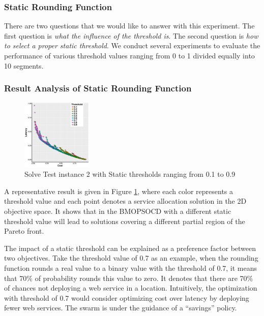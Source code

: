 \documentclass[10pt,journal,compsoc]{IEEEtran}
\begin{document}
\subsubsection{Static Rounding Function}
\label{sec:static_exp}
There are two questions that we would like to answer with this experiment. The first question is \textit{what the influence of the threshold is}. The second question is \textit{how to select a proper static threshold}. We conduct several experiments to evaluate the performance of various threshold values ranging from 0 to 1 divided equally into 10 segments. 

\subsubsection{Result Analysis of Static Rounding Function}
\label{sec:result_static}
\begin{figure}[h!]
	\centering
	\includegraphics[width=0.3\textwidth]{pics/static_threshold_problem_extra2.png}
	\caption{Solve Test instance 2 with Static thresholds ranging from 0.1 to 0.9}
	\label{fig:fullThreshold}
\end{figure}

A representative result is given in Figure \ref{fig:fullThreshold}, where each color represents a threshold value and each point denotes a service allocation solution in the 2D objective space. It shows that in the BMOPSOCD with a different static threshold value will lead to solutions covering a different partial region of the Pareto front. 

The impact of a static threshold can be explained as a preference factor between two objectives. Take the threshold value of 0.7 as an example, 
when the rounding function rounds a real value to a binary value with the threshold of 0.7, it means that 70\% of probability rounds this value to zero. It denotes that there are 70\% of chances not deploying a web service in a location. 
Intuitively, the optimization with threshold of 0.7 would consider optimizing cost over latency by deploying fewer web services. The swarm is under the 
guidance of a ``savings'' policy. 
\end{document}
